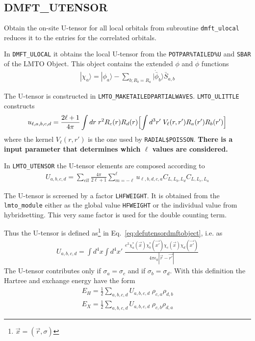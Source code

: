 \documentclass[11pt,a4paper]{report}
\begin{document}
\subsection{DMFT\_UTENSOR}
\label{sec:routinedmftutensor}
Obtain the on-site U-tensor for all local orbitals from
subroutine \verb|dmft_ulocal| reduces it to the entries for the
correlated orbitals.

In \verb|DMFT_ULOCAL| it obtains the local U-tensor from the
\verb|POTPAR%TAILED%U| and \verb|SBAR| of the LMTO Object. This object
contains the extended $\phi$ and $\dot{\phi}$ functions
\begin{eqnarray}
|\chi_a\rangle=|\phi_a\rangle-
\sum_{b; R_b=R_a}|\dot{\bar{\phi}}_b\rangle \bar{S}_{a,b}
\end{eqnarray}


The U-tensor is constructed in \verb|LMTO_MAKETAILEDPARTIALWAVES|.
\verb|LMTO_ULITTLE| constructs
\begin{eqnarray}
u_{\ell,a,b,c,d}
=\frac{2\ell+1}{4\pi}
\int dr\; r^2R_c(r)R_d(r)\Bigl[\int d^3r'\;V_\ell(r,r')R_a(r')R_b(r')\Bigr]
\end{eqnarray}
where the kernel $V_\ell(r,r')$ is the one used by \verb|RADIAL$POISSON|.
\textbf{There is a input parameter that determines which $\ell$ values are
considered.}

In \verb|LMTO_UTENSOR| the U-tensor elements are composed according to
\begin{eqnarray}
U_{a,b,c,d}=\sum_{ell}\frac{4\pi}{2\ell+1}\sum_{m=-\ell}^\ell
u_{\ell,b,d,c,a} C_{L,L_b,L_d}C_{L,L_c,L_a}
\end{eqnarray}

The U-tensor is screened by a factor \verb|LHFWEIGHT|. It is obtained
from the \verb|lmto_module| either as the global value \verb|HFWEIGHT|
or the individual value from hybridsetting. This very same factor is
used for the double counting term.

Thus the U-tensor is defined as\footnote{$\vec{x}=(\vec{r},\sigma)$}
in Eq.~\ref{eq:defutensordmftobject}, i.e. as
\begin{eqnarray}
U_{a,b,c,d}=\int d^4x\int d^4x'\;
\frac{e^2\chi^*_a(\vec{x})\chi^*_b(\vec{x'})\chi_c(\vec{x})\chi_d(\vec{x'})}
{4\pi\epsilon_0|\vec{r}-\vec{r'}|}
\end{eqnarray}
The U-tensor contributes only if $\sigma_a=\sigma_c$ and if
$\sigma_b=\sigma_d$.
With this definition the Hartree and exchange  energy have the form
\begin{eqnarray}
E_H=\frac{1}{2}\sum_{a,b,c,d}U_{a,b,c,d}\;\rho_{c,a}\rho_{d,b}
\nonumber\\
E_X=\frac{1}{2}\sum_{a,b,c,d}U_{a,b,c,d}\;\rho_{c,b}\rho_{d,a}
\end{eqnarray}
\end{document}
